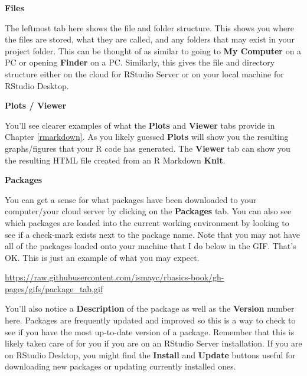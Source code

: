 \documentclass[]{tufte-book}
\theoremstyle{definition}
\theoremstyle{definition}
\theoremstyle{remark}
\begin{document}
\vspace*{0.2in}

\noindent\textbf{Files}\vspace*{0.1in}

The leftmost tab here shows the file and folder structure. This shows
you where the files are stored, what they are called, and any folders
that may exist in your project folder. This can be thought of as similar
to going to \textbf{My Computer} on a PC or opening \textbf{Finder} on a
PC. Similarly, this gives the file and directory structure either on the
cloud for RStudio Server or on your local machine for RStudio Desktop.

\vspace*{0.2in}

\noindent\textbf{Plots / Viewer}\vspace*{0.1in}

You'll see clearer examples of what the \textbf{Plots} and
\textbf{Viewer} tabs provide in Chapter \ref{rmarkdown}. As you likely
guessed \textbf{Plots} will show you the resulting graphs/figures that
your R code has generated. The \textbf{Viewer} tab can show you the
resulting HTML file created from an R Markdown \textbf{Knit}.

\vspace*{0.2in}

\noindent\textbf{Packages}\vspace*{0.1in}

You can get a sense for what packages have been downloaded to your
computer/your cloud server by clicking on the \textbf{Packages} tab. You
can also see which packages are loaded into the current working
environment by looking to see if a check-mark exists next to the package
name. Note that you may not have all of the packages loaded onto your
machine that I do below in the GIF. That's OK. This is just an example
of what you may expect.

\vspace{0.1in}

\begin{center}\footnotesize{\url{https://raw.githubusercontent.com/ismayc/rbasics-book/gh-pages/gifs/package_tab.gif}}\end{center}

\vspace{0.1in}

You'll also notice a \textbf{Description} of the package as well as the
\textbf{Version} number here. Packages are frequently updated and
improved so this is a way to check to see if you have the most
up-to-date version of a package. Remember that this is likely taken care
of for you if you are on an RStudio Server installation. If you are on
RStudio Desktop, you might find the \textbf{Install} and \textbf{Update}
buttons useful for downloading new packages or updating currently
installed ones.
\end{document}

